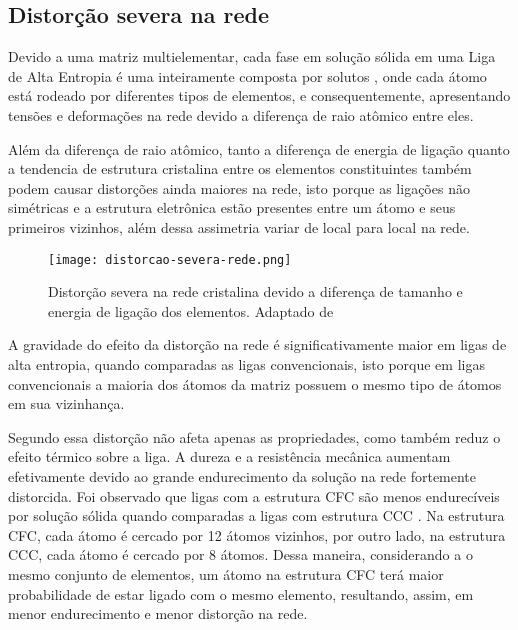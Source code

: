 



\subsection{Distorção severa na rede}\label{sec:LABEL_CHP_3_SEC_B_SUB_C}

Devido a uma matriz multielementar, cada fase em solução sólida em uma Liga de Alta Entropia é uma  inteiramente composta por solutos \cite{tong2005mechanical}, onde cada átomo está rodeado por diferentes tipos de elementos, e consequentemente, apresentando tensões e deformações na rede devido a diferença de raio atômico entre  eles.

Além da diferença de raio atômico, tanto a diferença de energia de ligação quanto a tendencia de estrutura cristalina entre os elementos constituintes também podem causar distorções ainda maiores na rede, isto porque as ligações não simétricas e a estrutura eletrônica estão presentes entre um átomo e seus primeiros vizinhos, além dessa assimetria variar de local para local na rede.\cite{tsai2013sluggish}\cite{yeh2007anomalous} 

\begin{figure}[ht]
    \centering
    \texttt{[image: distorcao-severa-rede.png]} 
    \caption{Distorção severa na rede cristalina devido a diferença de tamanho e energia de ligação dos elementos. Adaptado de \cite{yeh2013alloy}}
    \label{fig:internet}
\end{figure}

A gravidade do efeito da distorção na rede é significativamente maior em ligas de alta entropia, quando comparadas as ligas convencionais, isto porque em ligas convencionais a maioria dos átomos da matriz possuem o mesmo tipo de átomos em sua vizinhança.

Segundo \cite{yeh2013alloy} essa distorção não afeta apenas as propriedades, como também reduz o efeito térmico sobre a liga. A dureza e a resistência mecânica aumentam efetivamente devido ao grande endurecimento da solução na rede fortemente distorcida. Foi observado que ligas com a estrutura CFC são menos endurecíveis por solução sólida quando comparadas a ligas com estrutura CCC \cite{brooks1982heat}. Na estrutura CFC, cada átomo é cercado por 12 átomos vizinhos, por outro lado, na estrutura CCC, cada átomo é cercado por 8 átomos. Dessa maneira, considerando a o mesmo conjunto de elementos, um átomo na estrutura CFC terá maior probabilidade de estar ligado com o mesmo elemento, resultando, assim, em menor endurecimento e menor distorção na rede\cite{dieter1976mechanical}.

